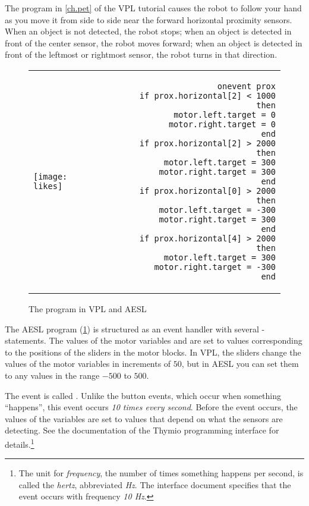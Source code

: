 The program  in \cref{ch.pet} of the VPL tutorial causes the
robot to follow your hand as you move it from side to side near the
forward horizontal proximity sensors.
When an object is not detected, the robot stops; when an object is
detected in front of the center sensor, the robot moves forward; when an
object is detected in front of the leftmost or rightmost sensor, the
robot turns in that direction.

\begin{figure}[hbt]
\begin{center}
\begin{tabular}{lr}
\texttt{[image: likes]} &
\begin{minipage}[b]{.4\textwidth}
\begin{footnotesize}
\begin{verbatim}
  onevent prox
    if prox.horizontal[2] < 1000 then
      motor.left.target = 0
      motor.right.target = 0
    end
    if prox.horizontal[2] > 2000 then
      motor.left.target = 300
      motor.right.target = 300
    end
    if prox.horizontal[0] > 2000 then
      motor.left.target = -300
      motor.right.target = 300
    end
    if prox.horizontal[4] > 2000 then
      motor.left.target = 300
      motor.right.target = -300
    end
\end{verbatim}
\end{footnotesize}
\end{minipage}
\end{tabular}
\caption{The  program in VPL and AESL}\label{fig.arrays}
\end{center}
\end{figure}

The AESL program (\cref{fig.arrays}) is structured as an event handler
with several -statements. The values of the motor variables
 and  are set to values
corresponding to the positions of the sliders in the motor blocks. In
VPL, the sliders change the values of the motor variables in increments
of $50$, but in AESL you can set them to any values in the range $-500$
to $500$.

The event is called . Unlike the button events, which
occur when something ``happens'', this event occurs \emph{10 times
every second}. Before the event occurs, the values of the
 variables are set to values that depend on what the
sensors are detecting. See the\label{pg.hz} documentation of the
Thymio programming interface for details.\footnote{The unit
for \emph{frequency}, the number of times something happens per second, is called
the \emph{hertz}, abbreviated \emph{Hz}. The interface document specifies
that the {\footnotesize{}} event occurs with frequency \emph{10 Hz}.}

